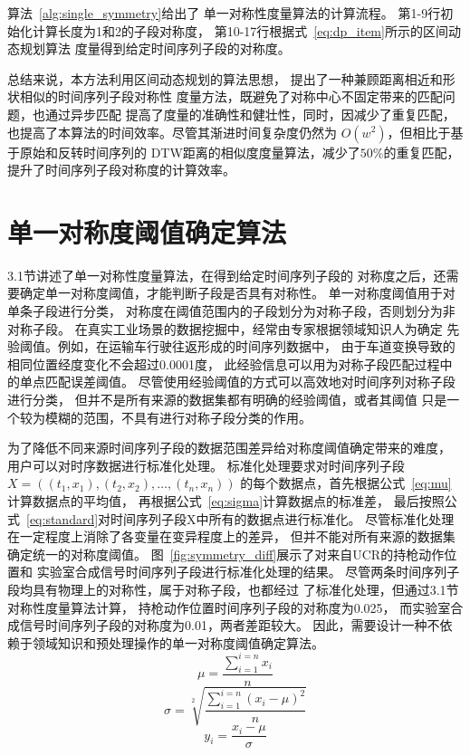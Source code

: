 算法~\ref{alg:single_symmetry}给出了
单一对称性度量算法的计算流程。
第1-9行初始化计算长度为1和2的子段对称度，
第10-17行根据式~\ref{eq:dp_item}所示的区间动态规划算法
度量得到给定时间序列子段的对称度。

总结来说，本方法利用区间动态规划的算法思想，
提出了一种兼顾距离相近和形状相似的时间序列子段对称性
度量方法，既避免了对称中心不固定带来的匹配问题，也通过异步匹配
提高了度量的准确性和健壮性，同时，因减少了重复匹配，
也提高了本算法的时间效率。尽管其渐进时间复杂度仍然为
$O\left(w^{2}\right)$，但相比于基于原始和反转时间序列的
DTW距离的相似度度量算法，减少了$50 \%$的重复匹配，
提升了时间序列子段对称度的计算效率。

\section{单一对称度阈值确定算法}

3.1节讲述了单一对称性度量算法，在得到给定时间序列子段的
对称度之后，还需要确定单一对称度阈值，才能判断子段是否具有对称性。
单一对称度阈值用于对单条子段进行分类，
对称度在阈值范围内的子段划分为对称子段，否则划分为非对称子段。
在真实工业场景的数据挖掘中，经常由专家根据领域知识人为确定
先验阈值。例如，在运输车行驶往返形成的时间序列数据中，
由于车道变换导致的相同位置经度变化不会超过0.0001度，
此经验信息可以用为对称子段匹配过程中的单点匹配误差阈值。
尽管使用经验阈值的方式可以高效地对时间序列对称子段进行分类，
但并不是所有来源的数据集都有明确的经验阈值，或者其阈值
只是一个较为模糊的范围，不具有进行对称子段分类的作用。

为了降低不同来源时间序列子段的数据范围差异给对称度阈值确定带来的难度，
用户可以对时序数据进行标准化处理。
标准化处理要求对时间序列子段
$X=\left(\left(t_{1}, x_{1}\right),\left(t_{2}, x_{2}\right), \ldots,\left(t_{n}, x_{n}\right)\right)$
的每个数据点，首先根据公式~\ref{eq:mu}计算数据点的平均值，
再根据公式~\ref{eq:sigma}计算数据点的标准差，
最后按照公式~\ref{eq:standard}对时间序列子段X中所有的数据点进行标准化。
尽管标准化处理在一定程度上消除了各变量在变异程度上的差异，
但并不能对所有来源的数据集确定统一的对称度阈值。
图~\ref{fig:symmetry_diff}展示了对来自UCR的持枪动作位置和
实验室合成信号时间序列子段进行标准化处理的结果。
尽管两条时间序列子段均具有物理上的对称性，属于对称子段，也都经过
了标准化处理，但通过3.1节对称性度量算法计算，
持枪动作位置时间序列子段的对称度为0.025，
而实验室合成信号时间序列子段的对称度为0.01，两者差距较大。
因此，需要设计一种不依赖于领域知识和预处理操作的单一对称度阈值确定算法。
\begin{equation}
  \mu=\frac{\sum_{i=1}^{i=n} x_{i}}{n}
  \label{eq:mu}
\end{equation}
\begin{equation}
  \sigma=\sqrt[2]{\frac{\sum_{i=1}^{i=n}\left(x_{i}-\mu\right)^{2}}{n}}
  \label{eq:sigma}
\end{equation}
\begin{equation}
  y_{i}=\frac{x_{i}-\mu}{\sigma}
  \label{eq:standard}
\end{equation}

